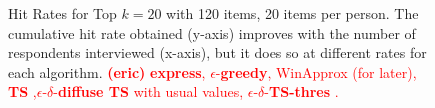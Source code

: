 \documentclass[nonblindrev]{informs3}
\newcommand{\eric}[1]{\textcolor{red}{\textbf{(eric)} #1}}
\newcommand{\fixedexpress}{\textbf{express}}
\newcommand{\egreedy}{$\epsilon$-\textbf{greedy}}
\newcommand{\ts}{\textbf{TS} }
\newcommand{\edts}{$\epsilon$-$\delta$-\textbf{diffuse TS} }
\newcommand{\edtsthres}{$\epsilon$-$\delta$-\textbf{TS-thres} }
\begin{document}
\begin{figure}%
    \caption{Hit Rates for Top $k=20$ with 120 items, 20 items per person. The cumulative hit rate obtained (y-axis) improves with the number of respondents interviewed (x-axis), but it does so at different rates for each algorithm. \eric{\fixedexpress, \egreedy, WinApprox (for later), \ts,\edts with usual values, \edtsthres.}}%
    \label{fig:K120_L20_k3hit_k10hit}%
 	\begin{center}
    \qquad
	\end{center}
\end{figure}
\end{document}
